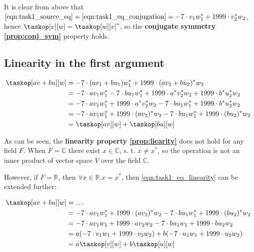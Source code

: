 \documentclass[a4paper]{article}
\theoremstyle{break}
\theoremstyle{break}
\begin{document}
It is clear from above that $\eqref{eqn:task1_source_eq} = \eqref{eqn:task1_eq_conjugation} = -7 \cdot v_1w_1^* + 1999 \cdot v_2^*w_2$, hence $\taskop[v][w] = \taskop[w][v]^*$, so the \textbf{conjugate symmetry \ref{prop:conj_sym}} property holds.

\subsection{Linearity in the first argument}

\begin{equation} \label{eqn:task1_eq_linearity}
  \begin{split}
    \taskop[av + bu][w]
      &= -7 \cdot (av_1 + bu_1)w_1^* + 1999 \cdot (av_2 + bu_2)^*w_2 \\
      &= -7 \cdot av_1w_1^* - 7 \cdot bu_1w_1^* + 1999 \cdot a^*v_2^*w_2 + 1999 \cdot b^*u_2^*w_2 \\
      &= -7 \cdot av_1w_1^* + 1999 \cdot a^*v_2^*w_2 - 7 \cdot bu_1w_1^* + 1999 \cdot b^*u_2^*w_2 \\
      &= -7 \cdot av_1w_1^* + 1999 \cdot (av_2)^*w_2 - 7 \cdot bu_1w_1^* + 1999 \cdot (bu_2)^*w_2 \\
      &= \taskop[av][w] + \taskop[bu][w]
  \end{split}
\end{equation}

As can be seen, the \textbf{linearity property \ref{prop:liearity}} does not hold for any field $F$. When $F = \mathbb{C}$ there exist $x \in \mathbb{C}$, s. t. $x \neq x^*$, so the operation \taskop is not an inner product of vector space $V$ over the field $\mathbb{C}$.

However, if $F = \mathbb{R}$, then $\forall x \in \mathbb{R}. x = x^*$, then \eqref{eqn:task1_eq_linearity} can be extended further:

\begin{equation*}
  \begin{split}
    \taskop[av + bu][w] &= \dotsc \\
      &= -7 \cdot av_1w_1^* + 1999 \cdot (av_2)^*w_2 - 7 \cdot bu_1w_1^* + 1999 \cdot (bu_2)^*w_2 \\
      &= -7 \cdot av_1w_1 + 1999 \cdot av_2w_2 - 7 \cdot bu_1w_1 + 1999 \cdot bu_2w_2 \\
      &= a(-7 \cdot v_1w_1 + 1999 \cdot v_2w_2) + b(-7 \cdot u_1w_1 + 1999 \cdot u_2w_2) \\
      &= a\taskop[v][w] + b\taskop[u][w]
  \end{split}
\end{equation*}
\end{document}
